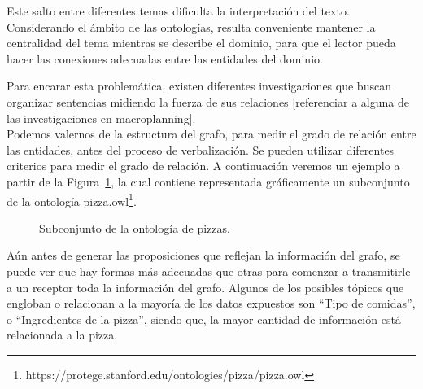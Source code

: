 Este salto entre diferentes temas dificulta la interpretación del texto. Considerando el ámbito de las ontologías, resulta conveniente mantener la centralidad del tema mientras se describe el dominio, para que el lector pueda hacer las conexiones adecuadas entre las entidades del dominio.

Para encarar esta problemática, existen diferentes investigaciones que buscan organizar sentencias midiendo la fuerza de sus relaciones [referenciar a alguna de las investigaciones en macroplanning]. 
\\
Podemos valernos de la estructura del grafo, para medir el grado de relación entre las entidades, antes del proceso de verbalización. Se pueden utilizar diferentes criterios para medir el grado de relación. A continuación veremos un ejemplo a partir de la Figura~\ref{fig:pizza.owl}, la cual contiene representada gráficamente un subconjunto de la ontología pizza.owl\footnote{https://protege.stanford.edu/ontologies/pizza/pizza.owl}.

\begin{figure}
\centering
{}
\caption{Subconjunto de la ontología de pizzas.} \label{fig:pizza.owl}
\end{figure}

Aún antes de generar las proposiciones que reflejan la información del grafo, se puede ver que hay formas más adecuadas que otras para comenzar a transmitirle a un receptor toda la información del grafo. Algunos de los posibles tópicos que engloban o relacionan a la mayoría de los datos expuestos son ``Tipo de comidas'', o ``Ingredientes de la pizza'', siendo que, la mayor cantidad de información está relacionada a la pizza. 

